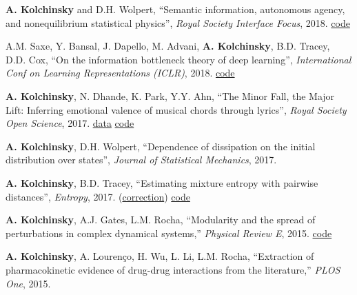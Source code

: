 \textbf{A. Kolchinsky} and D.H. Wolpert, 
``Semantic information, autonomous agency, and nonequilibrium statistical physics'', 
\emph{Royal Society Interface Focus}, 2018. 
\href{https://github.com/artemyk/semantic_information/}{code} 

A.M. Saxe, Y. Bansal, J. Dapello, M. Advani, \textbf{A. Kolchinsky}, B.D. Tracey, D.D. Cox, 
``On the information bottleneck theory of deep learning'', \emph{International Conf on Learning Representations (ICLR)}, 2018. 
 \href{https://github.com/artemyk/ibsgd/tree/iclr2018}{code} 

\textbf{A. Kolchinsky}, N. Dhande, K. Park, Y.Y. Ahn, ``The Minor Fall, the Major Lift: Inferring emotional valence of musical chords through lyrics'', \emph{Royal Society Open Science}, 2017. 
\href{https://doi.org/10.6084/m9.figshare.5413060.v1.}{data} 
\href{https://github.com/artemyk/chordsentiment}{code} 

\textbf{A. Kolchinsky}, D.H. Wolpert, ``Dependence of dissipation on the initial distribution over states'',
\emph{Journal of Statistical Mechanics}, 2017. 
  

\textbf{A. Kolchinsky}, B.D. Tracey, ``Estimating mixture entropy with pairwise distances'', \emph{Entropy}, 2017.
(\href{https://www.mdpi.com/1099-4300/19/11/588}{correction}) 
\href{https://github.com/btracey/mixent/}{code} 


\textbf{A. Kolchinsky}, A.J. Gates, L.M. Rocha, ``Modularity and
the spread of perturbations in complex dynamical systems,'' \emph{Physical Review E}, 2015. 
\href{https://github.com/artemyk/perturbationmodularity/}{code} 

\textbf{A. Kolchinsky}, A. Lourenço, H. Wu, L. Li, L.M. Rocha,
``Extraction of pharmacokinetic evidence of drug-drug interactions
from the literature,'' \emph{PLOS One}, 2015. 
 

